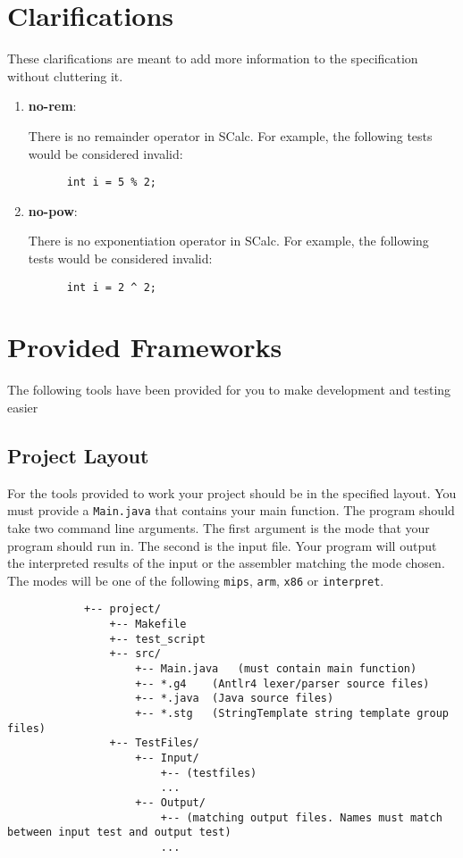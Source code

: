 \documentclass{article}
\newcommand{\clarificationdest}[1]{\hypertarget{#1}{\textbf{#1}:}}
\begin{document}
\section{Clarifications}
These clarifications are meant to add more information to the specification without cluttering it.
\begin{enumerate}
  \item
    \clarificationdest{no-rem}
    There is no remainder operator in SCalc. For example, the following tests would be considered
    invalid:
    \begin{lstlisting}
      int i = 5 % 2;
    \end{lstlisting}
  \item
    \clarificationdest{no-pow}
    There is no exponentiation operator in SCalc. For example, the following tests would be
    considered invalid:
    \begin{lstlisting}
      int i = 2 ^ 2;
    \end{lstlisting}
\end{enumerate}

\section{Provided Frameworks}

	The following tools have been provided for you to make development and testing easier

	\subsection{Project Layout}

		For the tools provided to work your project should be in the specified layout. You must provide a \texttt{Main.java} that contains your main function. The program should take two command line arguments. The first argument is the mode that your program should run in. The second is the input file. Your program will output the interpreted results of the input or the assembler matching the mode chosen. The modes will be one of the following \texttt{mips}, \texttt{arm}, \texttt{x86} or \texttt{interpret}.

		\begin{lstlisting}
			+-- project/
				+-- Makefile
				+-- test_script
				+-- src/
					+-- Main.java	(must contain main function)
					+-- *.g4	(Antlr4 lexer/parser source files)
					+-- *.java	(Java source files)
					+-- *.stg	(StringTemplate string template group files)
				+-- TestFiles/
					+-- Input/
						+-- (testfiles)
						...
					+-- Output/
						+-- (matching output files. Names must match between input test and output test)
						...
		\end{lstlisting}
\end{document}
